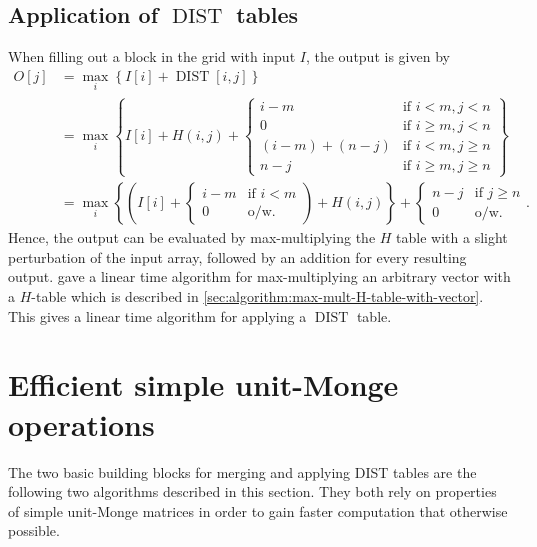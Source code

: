 \documentclass[twoside,11pt,openright]{report}
\newcommand{\DIST}{\operatorname{DIST}}
\begin{document}
\subsection{Application of $\DIST$ tables}
When filling out a block in the grid with input $I$, the output is given by
\begin{align*}
  O[j] &= \max_i \left\{ I[i] + \DIST[i, j] \right\} \\
    &= \max_i \left\{ I[i] + H(i, j) + \left\{
      \begin{array}{ll}
        i - m             & \text{if } i < m, j < n \\
        0                 & \text{if } i \geq m, j < n \\
        (i - m) + (n - j) & \text{if } i < m, j \geq n \\
        n - j             & \text{if } i \geq m, j \geq n
      \end{array}
    \right. \right\} \\
    &= \max_i\left\{ \left( I[i] + \left\{
      \begin{array}{ll}
        i - m     & \text{if } i < m \\
        0         & \text{o/w.}
      \end{array}
    \right. \right) + H(i, j) \right\} + \left\{
      \begin{array}{ll}
        n - j     & \text{if } j \geq n \\
        0         & \text{o/w.}
      \end{array}
    \right. .
\end{align*}
Hence, the output can be evaluated by max-multiplying the $H$ table with a slight perturbation of the input array, followed by an addition for every resulting output. \cite{Gawrychowski:2012:FAC:2422024.2422048} gave a linear time algorithm for max-multiplying an arbitrary vector with a $H$-table which is described in \cref{sec:algorithm:max-mult-H-table-with-vector}. This gives a linear time algorithm for applying a $\DIST$ table.

\section{Efficient simple unit-Monge operations}
The two basic building blocks for merging and applying DIST tables are the following two algorithms described in this section. They both rely on properties of simple unit-Monge matrices in order to gain faster computation that otherwise possible.
\end{document}
